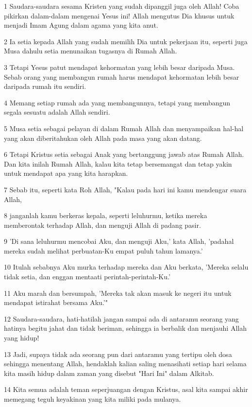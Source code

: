 \par 1 Saudara-saudara sesama Kristen yang sudah dipanggil juga oleh Allah! Coba pikirkan dalam-dalam mengenai Yesus ini! Allah mengutus Dia khusus untuk menjadi Imam Agung dalam agama yang kita anut.
\par 2 Ia setia kepada Allah yang sudah memilih Dia untuk pekerjaan itu, seperti juga Musa dahulu setia menunaikan tugasnya di Rumah Allah.
\par 3 Tetapi Yesus patut mendapat kehormatan yang lebih besar daripada Musa. Sebab orang yang membangun rumah harus mendapat kehormatan lebih besar daripada rumah itu sendiri.
\par 4 Memang setiap rumah ada yang membangunnya, tetapi yang membangun segala sesuatu adalah Allah sendiri.
\par 5 Musa setia sebagai pelayan di dalam Rumah Allah dan menyampaikan hal-hal yang akan diberitahukan oleh Allah pada masa yang akan datang.
\par 6 Tetapi Kristus setia sebagai Anak yang bertanggung jawab atas Rumah Allah. Dan kita inilah Rumah Allah, kalau kita tetap bersemangat dan tetap yakin untuk mendapat apa yang kita harapkan.
\par 7 Sebab itu, seperti kata Roh Allah, "Kalau pada hari ini kamu mendengar suara Allah,
\par 8 janganlah kamu berkeras kepala, seperti leluhurmu, ketika mereka memberontak terhadap Allah, dan menguji Allah di padang pasir.
\par 9 'Di sana leluhurmu mencobai Aku, dan menguji Aku,' kata Allah, 'padahal mereka sudah melihat perbuatan-Ku empat puluh tahun lamanya.'
\par 10 Itulah sebabnya Aku murka terhadap mereka dan Aku berkata, 'Mereka selalu tidak setia, dan enggan mentaati perintah-perintah-Ku.'
\par 11 Aku marah dan bersumpah, 'Mereka tak akan masuk ke negeri itu untuk mendapat istirahat bersama Aku.'"
\par 12 Saudara-saudara, hati-hatilah jangan sampai ada di antaramu seorang yang hatinya begitu jahat dan tidak beriman, sehingga ia berbalik dan menjauhi Allah yang hidup!
\par 13 Jadi, supaya tidak ada seorang pun dari antaramu yang tertipu oleh dosa sehingga menentang Allah, hendaklah kalian saling menasihati setiap hari selama kita masih hidup dalam zaman yang disebut "Hari Ini" dalam Alkitab.
\par 14 Kita semua adalah teman seperjuangan dengan Kristus, asal kita sampai akhir memegang teguh keyakinan yang kita miliki pada mulanya.
